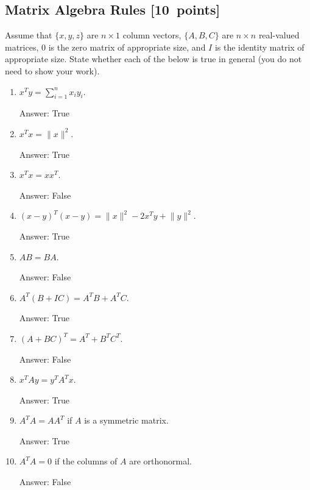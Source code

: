 \documentclass{article}
\newcommand{\blu}[1]{{\textcolor{blu}{#1}}}
\newenvironment{answer}{\par\begingroup\color{gre}Answer: }{\endgroup}
\let\ask\blu
\newcommand\pts[1]{\textcolor{pointscolour}{[#1~points]}}
\newcommand{\norm}[1]{\lVert #1 \rVert}
\begin{document}
  \subsection{Matrix Algebra Rules \pts{10}}

  Assume that $\{x,y,z\}$ are $n \times 1$ column vectors, $\{A,B,C\}$ are $n \times n$ real-valued matrices, $0$ is the zero matrix of appropriate size, and $I$ is the identity matrix of appropriate size. \ask{State whether each of the below is true in general} (you do not need to show your work).

  \begin{enumerate}
  \item $x^Ty = \sum_{i=1}^n x_iy_i$.
    \begin{answer}
        True
    \end{answer}
  \item $x^Tx = \norm{x}^2$.
  \begin{answer}
      True
  \end{answer}
  \item $x^Tx = xx^T$.
  \begin{answer}
      False
  \end{answer}
  \item $(x-y)^T(x-y) = \norm{x}^2 - 2x^Ty + \norm{y}^2$.
  \begin{answer}
      True
  \end{answer}
  \item $AB=BA$.
  \begin{answer}
      False
  \end{answer}
  \item $A^T(B + IC) = A^TB + A^TC$.
    \begin{answer}
      True
  \end{answer}
  \item $(A + BC)^T = A^T + B^TC^T$.
    \begin{answer}
      False
  \end{answer}
  \item $x^TAy = y^TA^Tx$.
    \begin{answer}
      True
  \end{answer}
  \item $A^TA = AA^T$ if $A$ is a symmetric matrix.
    \begin{answer}
      True
  \end{answer}
  \item $A^TA = 0$ if the columns of $A$ are orthonormal.
    \begin{answer}
      False
  \end{answer}
  \end{enumerate}
\end{document}
